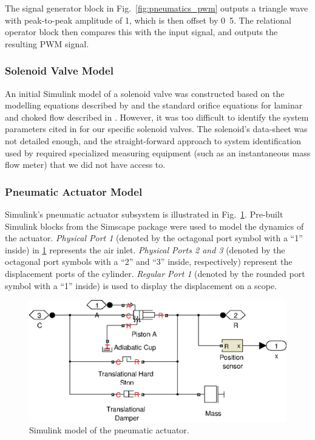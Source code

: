
The signal generator block in Fig.\ \ref{fig:pneumatics_pwm} outputs a triangle wave with peak-to-peak amplitude of \unit{1}{\volt}, which is then offset by \unit{0.5}{\volt}. The relational operator block then compares this with the input signal, and outputs the resulting PWM signal.

\subsubsection{Solenoid Valve Model}

An initial Simulink model of a solenoid valve was constructed based on the modelling equations described by \citet{valve_models} and the standard orifice equations for laminar and choked flow described in \cite{fluid_power}. However, it was too difficult to identify the system parameters cited in \cite{fluid_power} for our specific solenoid valves. The solenoid's data-sheet was not detailed enough, and the straight-forward approach to system identification used by \cite{valve_models} required specialized measuring equipment (such as an instantaneous mass flow meter) that we did not have access to.

\subsubsection{Pneumatic Actuator Model}

Simulink's pneumatic actuator subsystem is illustrated in Fig.\ \ref{fig:pneumatics_actuator}. Pre-built Simulink blocks from the Simscape package were used to model the dynamics of the actuator. \emph{Physical Port 1} (denoted by the octagonal port symbol with a ``1'' inside) in \ref{fig:pneumatics_actuator} represents the air inlet. \emph{Physical Ports 2 and 3} (denoted by the octagonal port symbols with a ``2'' and ``3'' inside, respectively) represent the displacement ports of the cylinder. \emph{Regular Port 1} (denoted by the rounded port symbol with a ``1'' inside) is used to display the displacement on a scope.

\begin{figure}[H]
\centering
\includegraphics[scale=0.65]{implementation/figures/pneumatic_modelling3}
\caption{Simulink model of the pneumatic actuator.}
\label{fig:pneumatics_actuator}
\end{figure}

